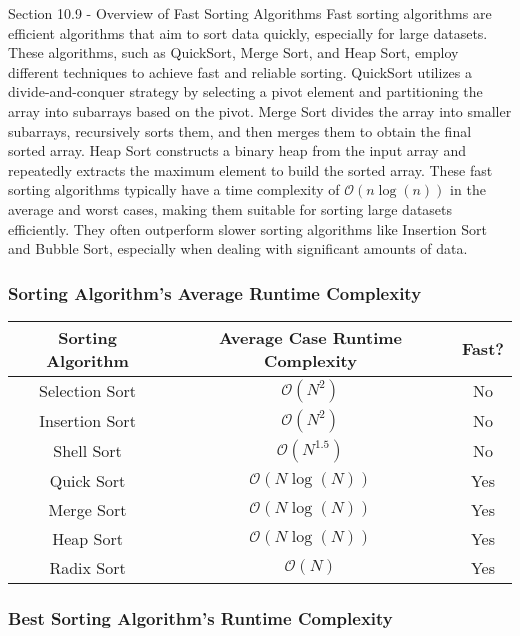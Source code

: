 \begin{notes}{Section 10.9 - Overview of Fast Sorting Algorithms}
    Fast sorting algorithms are efficient algorithms that aim to sort data quickly, especially for large datasets. These algorithms, such as QuickSort, Merge Sort, and Heap Sort, employ different techniques to achieve fast and reliable sorting. QuickSort utilizes a divide-and-conquer strategy by selecting a pivot element and partitioning the array into 
    subarrays based on the pivot. Merge Sort divides the array into smaller subarrays, recursively sorts them, and then merges them to obtain the final sorted array. Heap Sort constructs a binary heap from the input array and repeatedly extracts the maximum element to build the sorted array. These fast sorting algorithms typically have a time complexity of 
    $\mathcal{O}(n\log{(n)})$ in the average and worst cases, making them suitable for sorting large datasets efficiently. They often outperform slower sorting algorithms like Insertion Sort and Bubble Sort, especially when dealing with significant amounts of data.
    
    \subsubsection*{Sorting Algorithm's Average Runtime Complexity}
    
    \begin{center}
        \begin{tabular}{|c|c|c|}
            \hline Sorting Algorithm & Average Case Runtime Complexity & Fast? \\ \hline
            Selection Sort & $\mathcal{O}(N^2)$ & No \\ \hline
            Insertion Sort & $\mathcal{O}(N^2)$ & No \\ \hline
            Shell Sort & $\mathcal{O}(N^{1.5})$ & No \\ \hline
            Quick Sort & $\mathcal{O}(N\log{(N)})$ & Yes \\ \hline
            Merge Sort & $\mathcal{O}(N\log{(N)})$ & Yes \\ \hline
            Heap Sort & $\mathcal{O}(N\log{(N)})$ & Yes \\ \hline
            Radix Sort & $\mathcal{O}(N)$ & Yes \\ \hline
        \end{tabular}
    \end{center}
    
    \subsubsection*{Best Sorting Algorithm's Runtime Complexity}
    

\end{notes}
